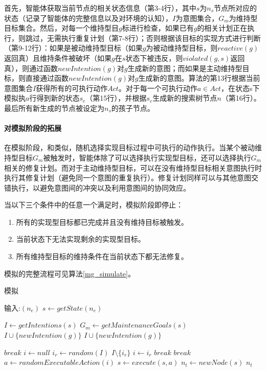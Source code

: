 首先，智能体获取当前节点的相关状态信息（第3-4行），其中$s$为$n_s$节点所对应的状态（记录了智能体的完整信息以及对环境的认知），$I$为意图集合，$G_m$为维持型目标集合。然后，对每一个维持型目$g$标进行检查，如果已有$g$的相关计划正在执行，则跳过，无需执行重复计划（第7-8行）；否则根据该目标的实现方式进行判断（第9-12行）：如果是被动维持型目标（如果$g$为被动维持型目标，则$reactive(g)$返回真）且维持条件被破坏（如果$g$在$s$状态下被违反，则$violated(g,s)$返回真），则通过函数$newIntention(g)$对$g$生成新的意图；而如果是主动维持型目标，则直接通过函数$newIntention(g)$对$g$生成新的意图。算法的第13行根据当前意图集合$I$获得所有的可执行动作$Act$。对于每一个可执行动作$a \in Act$，在状态s下模拟执$a$行得到新的状态$s_e$（第15行），并根据$s_e$生成新的搜索树节点$n$（第16行）。最后所有新生成的节点被设定为$n_s$的孩子节点。

\vspace{0.3cm}

\paragraph{对模拟阶段的拓展}
在模拟阶段，\SAM 和\SA 类似，随机选择实现目标过程中可执行的动作执行。当某个被动维持型目标$G_m$被触发时，智能体除了可以选择执行实现型目标，还可以选择执行$G_m$相关的修复计划。而对于主动维持型目标，\SAM 可以在没有维持型目标相关意图执行时执行其修复计划（避免同一个意图的重复执行）。修复计划同样可以与其他意图交错执行，以避免意图间的冲突以及利用意图间的协同效应。

当以下三个条件中的任意一个满足时，模拟阶段即停止：
\begin{enumerate}
  \item 所有的实现型目标都已完成并且没有维持目标被触发。
  \item 当前状态下无法实现剩余的实现型目标。
  \item 所有维持型目标的维持条件在当前状态下都无法修复。
\end{enumerate}
模拟的完整流程可见算法\ref{mg_simulate}。

\begin{algorithm}[H]
\caption{模拟}\label{mg_simulate}
\begin{algorithmic}[1]
\STATE 输入:$(n_e)$
\STATE $s \gets getState(n_e)$

  \STATE $I \gets getIntentions(s)$
  \STATE $G_m \gets getMaintenanceGoals(s)$
      \STATE $I \cup \{newIntention(g)\}$
    \ENDIF
      \STATE $I \cup \{newIntention(g)\}$
    \ENDIF
\ENDFOR

  \STATE $break$
\ENDIF
  \STATE $i \gets null$\label{mg_select_intention}
    \STATE $i_r \gets random(I)$
    \STATE $I \setminus \{i_r\}$
      \STATE $i \gets i_r$
      \STATE $break$
    \ENDIF
  \ENDWHILE
    \STATE $break$
  \ENDIF
  \STATE $a \gets randomExecutableAction(i)$
  \STATE $s \gets execute(s, a)$
\ENDWHILE
\STATE $n_t \gets newNode(s)$
\RETURN $n_t$
\end{algorithmic}
\end{algorithm}

